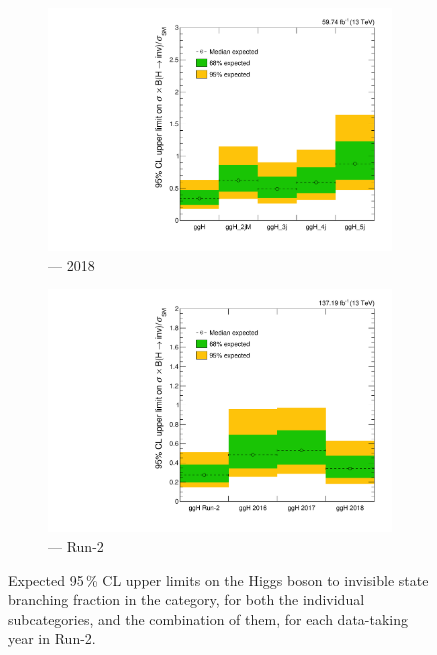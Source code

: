 \begin{figure}[htbp]
    \begin{subfigure}[b]{0.45\textwidth}
        \includegraphics[width=\textwidth]{figures/limits/ggF/limit_2018_ggF_Scenario5.pdf}
        \caption{\ggH --- 2018}
    \end{subfigure}
    \hfill
    \begin{subfigure}[b]{0.45\textwidth}
        \includegraphics[width=\textwidth]{figures/limits/ggF/limit_Run2_ggF_Scenario5.pdf}
        \caption{\ggH --- Run-2}
    \end{subfigure}
    \caption[Expected 95\,\% CL upper limits on the Higgs boson to invisible state branching fraction in the \ggH category, for both the individual subcategories, and the combination of them, for each data-taking year in Run-2]{Expected 95\,\% CL upper limits on the Higgs boson to invisible state branching fraction in the \ggH category, for both the individual subcategories, and the combination of them, for each data-taking year in Run-2.}
    \label{fig:htoinv_limit_ggF}
\end{figure}


